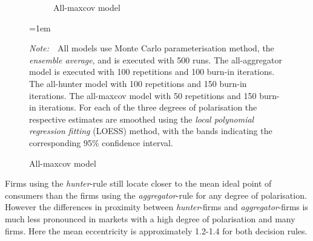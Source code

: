 \documentclass[preprint, 12pt]{elsarticle}
\newcommand{\Figtext}[1]{%
	\begin{tablenotes}[para,flushleft]
		\hangindent=1em
		\footnotesize
		\raggedright
		#1
	\end{tablenotes}
}
\newcommand{\Fignote}[1]{\Figtext{\emph{Note:~}~#1}}
\begin{document}
\begin{figure}[ht!]
\begin{subfigure}[t]{0.315\textwidth}
		\caption{All-maxcov model}
		\label{fig:eccentricity_maxcov}
	\end{subfigure}
	
	\label{fig:asymetric_eccentricity}
		\Fignote{All models use Monte Carlo parameterisation method, the \emph{ensemble average}, and is executed with 500 runs. The all-aggregator model is executed with 100 repetitions and 100 burn-in iterations. The all-hunter model with 100 repetitions and 150 burn-in iterations. The all-maxcov model with 50 repetitions and 150 burn-in iterations. For each of the three degrees of polarisation the respective estimates are smoothed using the \emph{local polynomial regression fitting} (LOESS) method, with the bands indicating the corresponding 95\% confidence interval.}
\end{figure}

Firms using the \emph{hunter}-rule still locate closer to the mean ideal point of consumers than the firms using the \emph{aggregator}-rule for any degree of polarisation. However the differences in proximity between \emph{hunter}-firms and \emph{aggregator}-firms is much less pronounced in markets with a high degree of polarisation and many firms. Here the mean eccentricity is approximately 1.2-1.4 for both decision rules.
\end{document}
